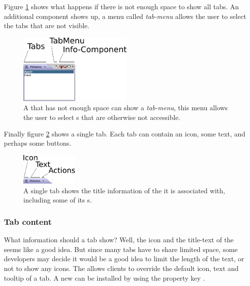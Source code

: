 Figure \ref{fig:smallTabs} shows what happens if there is not enough space to show all tabs. An additional component shows up, a menu called \emph{tab-menu} allows the user to select the tabs that are not visible.

\begin{figure}[h!]
  \centering
    \includegraphics[width=0.5\textwidth]{stations/smallTabs}
  \caption{A  that has not enough space can show a \emph{tab-menu}, this menu allows the user to select s that are otherwise not accessible.}
  \label{fig:smallTabs}
\end{figure}

Finally figure \ref{fig:tab} shows a single tab. Each tab can contain an icon, some text, and perhaps some buttons.

\begin{figure}[h!]
  \centering
    \includegraphics[width=0.25\textwidth]{stations/tab}
  \caption{A single tab shows the title information of the  it is associated with, including some of its s.}
  \label{fig:tab}
\end{figure}


\subsubsection{Tab content}
What information should a tab show? Well, the icon and the title-text of the  seems like a good idea. But since many tabs have to share limited space, some developers may decide it would be a good idea to limit the length of the text, or not to show any icons. The  allows clients to override the default icon, text and tooltip of a tab. A new  can be installed by using the property key .

